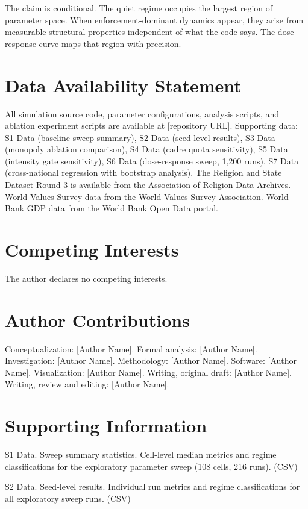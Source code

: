 \documentclass[12pt]{article}
\begin{document}
The claim is conditional. The quiet regime occupies the largest region of
parameter space. When enforcement-dominant dynamics appear, they arise
from measurable structural properties independent of what the code says.
The dose-response curve maps that region with precision.

\section*{Data Availability Statement}

All simulation source code, parameter configurations, analysis scripts,
and ablation experiment scripts are available at [repository URL].
Supporting data: S1 Data (baseline sweep summary), S2 Data (seed-level
results), S3 Data (monopoly ablation comparison), S4 Data (cadre quota
sensitivity), S5 Data (intensity gate sensitivity), S6 Data
(dose-response sweep, 1,200 runs), S7 Data (cross-national regression
with bootstrap analysis). The Religion and State Dataset Round 3 is
available from the Association of Religion Data Archives. World Values
Survey data from the World Values Survey Association. World Bank GDP data
from the World Bank Open Data portal.

\section*{Competing Interests}

The author declares no competing interests.

%
\section*{Author Contributions}

Conceptualization: [Author Name]. Formal analysis: [Author Name]. Investigation: [Author Name]. Methodology: [Author Name]. Software: [Author Name]. Visualization: [Author Name]. Writing, original draft: [Author Name]. Writing, review and editing: [Author Name].

%
\section*{Supporting Information}

S1 Data. Sweep summary statistics. Cell-level median metrics and regime classifications for the exploratory parameter sweep (108 cells, 216 runs). (CSV)

S2 Data. Seed-level results. Individual run metrics and regime classifications for all exploratory sweep runs. (CSV)
\end{document}
